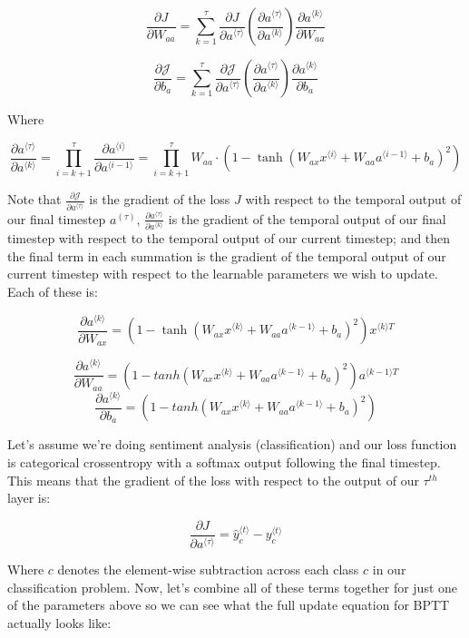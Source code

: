\documentclass[12pt]{article}
\begin{document}
\[\frac{\partial J}{\partial W_{aa}} = \sum_{k=1}^\tau \frac{\partial J}{\partial a^{\langle \tau \rangle}} \left( \frac{\partial a^{\langle \tau \rangle}}{\partial a^{\langle k \rangle}} \right) \frac{\partial a^{\langle k \rangle}}{\partial W_{aa}}\]


\[\frac{\partial \mathcal{J}}{\partial b_{a}} = \sum_{k=1}^{\tau} \frac{\partial \mathcal{J}}{\partial a^{\langle \tau \rangle}} \left( \frac{\partial a^{\langle \tau \rangle}}{\partial a^{\langle k \rangle}} \right) \frac{\partial a^{\langle k \rangle}}{\partial b_{a}}
\]

Where 

\[\frac{\partial a^{\langle \tau \rangle}}{\partial a^{\langle k \rangle}} = \prod_{i=k+1}^{\tau} \frac{\partial a ^{\langle i \rangle}}{\partial a ^{\langle i - 1 \rangle}} = \prod_{i=k+1}^{\tau}W_{aa} \cdot (1-\tanh(W_{ax}x^{\langle i \rangle} +W_{aa}a^{\langle i-1\rangle}+b_a)^2) \]

Note that \(\frac{\partial \mathcal{J}}{\partial a^{\langle \tau \rangle}}\) is the gradient of the loss \(J\) with respect to the temporal output of our final timestep \(a^{(\tau)}\), \(\frac{\partial a^{\langle \tau \rangle}}{\partial a^{\langle k \rangle}}\) is the gradient of the temporal output of our final timestep with respect to the temporal output of our current timestep; and then the final term in each summation is the gradient of the temporal output of our current timestep with respect to the learnable parameters we wish to update. Each of these is: 

\[\frac{\partial a^{\langle k \rangle}}{\partial W_{ax}} = (1 - \tanh(W_{ax}x^{\langle k \rangle} + W_{aa}a^{\langle k-1\rangle} + b_a)^2) x^{\langle k \rangle T}\] 

\[\frac{\partial a^{\langle k \rangle}}{\partial W_{aa}}  = (1-tanh(W_{ax}x^{\langle k \rangle} +W_{aa}a^{\langle k-1\rangle}+b_a)^2)a^{\langle k- 1\rangle T}\]
\[\frac{\partial a^{\langle k \rangle}}{\partial b_{a}} = (1-tanh(W_{ax}x^{\langle k \rangle} +W_{aa}a^{\langle k-1\rangle}+b_a)^2)\]

Let's assume we're doing sentiment analysis (classification) and our loss function is categorical crossentropy with a softmax output following the final timestep. This means that the gradient of the loss with respect to the output of our \(\tau^{th}\) layer is:

\[\frac{\partial J}{\partial a^{\langle \tau \rangle}} = \hat{y}_c^{\langle t \rangle} - y_c^{\langle t \rangle} \]

Where \(c\) denotes the element-wise subtraction across each class \(c\) in our classification problem. Now, let's combine all of these terms together for just one of the parameters above so we can see what the full update equation for BPTT actually looks like: 
\end{document}
